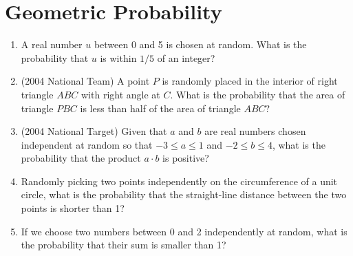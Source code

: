 \documentclass{article}
\begin{document}
\section*{Geometric Probability}

\begin{enumerate}
\item A real number $u$ between 0 and 5 is chosen at random. What is the probability that $u$ is within $1/5$ of an integer?\vspace{3cm}
\item (2004 National Team) A point $P$ is randomly placed in the interior of right triangle $ABC$ with right angle at $C$. What is the probability that the area of triangle $PBC$ is less than half of the area of triangle $ABC$?\vspace{3cm}
\item (2004 National Target) Given that $a$ and $b$ are real numbers chosen independent at random so that $-3\leq a\leq 1$ and $-2\leq b\leq 4$, what is the probability that the product $a\cdot b$ is positive?\vspace{3cm}
\item Randomly picking two points independently on the circumference of a unit circle, what is the probability that the straight-line distance between the two points is shorter than 1?\vspace{3cm}
\item If we choose two numbers between 0 and 2 independently at random, what is the probability that their sum is smaller than 1?
\end{enumerate} 




\end{document}
